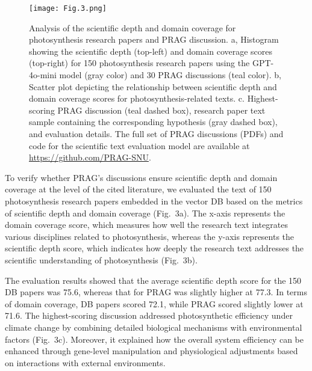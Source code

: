 \documentclass[12pt]{article}
\begin{document}
\begin{figure}[htbp!]
    \centering
    \texttt{[image: Fig.3.png]}
    \caption{Analysis of the scientific depth and domain coverage for photosynthesis research papers and PRAG discussion. a, Histogram showing the scientific depth (top-left) and domain coverage scores (top-right) for 150 photosynthesis research papers using the GPT-4o-mini model (gray color) and 30 PRAG discussions (teal color). b, Scatter plot depicting the relationship between scientific depth and domain coverage scores for photosynthesis-related texts. c. Highest-scoring PRAG discussion (teal dashed box), research paper text sample containing the corresponding hypothesis (gray dashed box), and evaluation details. The full set of PRAG discussions (PDFs) and code for the scientific text evaluation model are available at \url{https://github.com/PRAG-SNU}.
    }
    \label{fig:prag}
\end{figure}

To verify whether PRAG's discussions ensure scientific depth and domain coverage at the level of the cited literature, we evaluated the text of 150 photosynthesis research papers embedded in the vector DB based on the metrics of scientific depth and domain coverage (Fig.~3a). The x-axis represents the domain coverage score, which measures how well the research text integrates various disciplines related to photosynthesis, whereas the y-axis represents the scientific depth score, which indicates how deeply the research text addresses the scientific understanding of photosynthesis (Fig.~3b).

The evaluation results showed that the average scientific depth score for the 150 DB papers was 75.6, whereas that for PRAG was slightly higher at 77.3. In terms of domain coverage, DB papers scored 72.1, while PRAG scored slightly lower at 71.6. The highest-scoring discussion addressed photosynthetic efficiency under climate change by combining detailed biological mechanisms with environmental factors (Fig.~3c). Moreover, it explained how the overall system efficiency can be enhanced through gene-level manipulation and physiological adjustments based on interactions with external environments.
\end{document}
